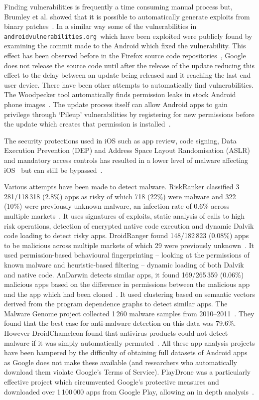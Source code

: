 \documentclass[conference,a4paper,twoside]{IEEEtran}
\let\OldTodo\todo
\renewcommand{\todo}{\OldTodo[inline]}
\newcommand{\todolater}[1]{}%
\newcommand{\avo}{\texttt{androidvulnerabilities.org}}
\begin{document}
Finding vulnerabilities is frequently a time consuming manual process but, Brumley et al. showed that it is possible to automatically generate exploits from binary patches~\cite{Brumley2008}.
In a similar way some of the vulnerabilities\todolater{which?} in \avo\ which have been exploited were publicly found by examining the commit made to the Android which fixed the vulnerability.
This effect has been observed before in the Firefox source code repositories~\cite{Barth2011}, Google does not release the source code until after the release of the update reducing this effect to the delay between an update being released and it reaching the last end user device.
There have been other attempts to automatically find vulnerabilities.
The Woodpecker tool automatically finds permission leaks in stock Android phone images~\cite{Grace2012}.
The update process itself can allow Android apps to gain privilege through `Pileup' vulnerabilities by registering for new permissions before the update which creates that permission is installed~\cite{Xing2014}.

The security protections used in iOS such as app review, code signing, Data Execution Prevention (DEP) and Address Space Layout Randomisation (ASLR) and mandatory access controls has resulted in a lower level of malware affecting iOS~\cite{Felt2011} but can still be bypassed~\cite{Wang2013a}.

Various attempts have been made to detect malware.
RiskRanker classified 3\,281/118\,318 (2.8\%) apps as risky of which 718 (22\%) were malware and 322 (10\%) were previously unknown malware, an infection rate of 0.6\% across multiple markets~\cite{Grace2012a}.
It uses signatures of exploits, static analysis of calls to high risk operations, detection of encrypted native code execution and dynamic Dalvik code loading to detect risky apps.
DroidRanger found 148/182\,823 (0.08\%) apps to be malicious across multiple markets of which 29 were previously unknown~\cite{Zhou2012a}.
It used permission-based behavioural fingerprinting -- looking at the permissions of known malware and heuristic-based filtering -- dynamic loading of both Dalvik and native code.
AnDarwin detects similar apps, it found 169/265\,359 (0.06\%) malicious apps based on the difference in permissions between the malicious app and the app which had been cloned~\cite{Crussell2013}.
It used clustering based on semantic vectors derived from the program dependence graphs to detect similar apps.
The Malware Genome project collected 1\,260 malware samples from 2010--2011~\cite{Zhou2012b}.
They found that the best case for anti-malware detection on this data was 79.6\%.
However DroidChameleon found that antivirus products could not detect malware if it was simply automatically permuted~\cite{Rastogi2013}.
All these app analysis projects have been hampered by the difficulty of obtaining full datasets of Android apps as Google does not make these available (and researchers who automatically download them violate Google's Terms of Service).
PlayDrone was a particularly effective project which circumvented Google's protective measures and downloaded over 1\,100\,000 apps from Google Play, allowing an in depth analysis~\cite{Viennot2014}.
\end{document}
